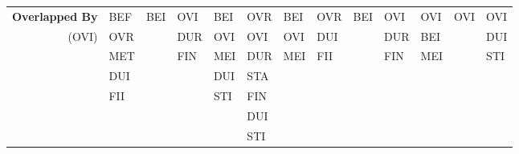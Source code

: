 \documentclass[11pt]{report}
\newenvironment{vvarmargin}[2]
{
  \begin{list}{}
  {
    \setlength{\topsep}{0pt}
    \setlength{\leftmargin}{0pt}
    \setlength{\rightmargin}{0pt}
    \setlength{\listparindent}{\parindent}
    \setlength{\itemindent}{\parindent}
    \setlength{\parsep}{0pt plus 1pt}
    \addtolength{\leftmargin}{#1}\addtolength{\rightmargin}{#2}
  }
  \item
}
{
  \end{list}
}
\begin{document}
\begin{table}[p]
\begin{vvarmargin}{-4cm}{-4cm}
\begin{center}
\begin{tabular}[t]{|r|l|l|l|l|l|l|l|l|l|l|l|l|}
                  \hline
                  \textbf{Overlapped By}  & BEF                     & BEI                     & OVI                     & BEI                     & OVR                     & BEI                     & OVR                     & BEI                     & OVI                     & OVI                     & OVI                     & OVI                     \\
                  (OVI)                   & OVR                     &                         & DUR                     & OVI                     & OVI                     & OVI                     & DUI                     &                         & DUR                     & BEI                     &                         & DUI                     \\
                                          & MET                     &                         & FIN                     & MEI                     & DUR                     & MEI                     & FII                     &                         & FIN                     & MEI                     &                         & STI                     \\
                                          & DUI                     &                         &                         & DUI                     & STA                     &                         &                         &                         &                         &                         &                         &                         \\
                                          & FII                     &                         &                         & STI                     & FIN                     &                         &                         &                         &                         &                         &                         &                         \\
                                          &                         &                         &                         &                         & DUI                     &                         &                         &                         &                         &                         &                         &                         \\
                                          &                         &                         &                         &                         & STI                     &                         &                         &                         &                         &                         &                         &                         \\

\end{tabular}
\end{center}
\end{vvarmargin}
\end{table}
\end{document}
